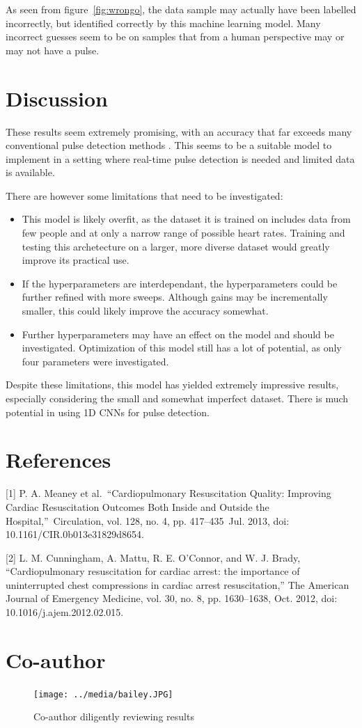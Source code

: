\documentclass{article}
\begin{document}
As seen from figure~\ref{fig:wrongo}, the data sample may actually have been labelled incorrectly, but identified correctly by this machine learning model. Many incorrect guesses seem to be on samples that from a human perspective may or may not have a pulse.


\section{Discussion}

These results seem extremely promising, with an accuracy that far exceeds many conventional pulse detection methods . This seems to be a suitable model to implement in a setting where real-time pulse detection is needed and limited data is available. 

There are however some limitations that need to be investigated:
\begin{itemize}

    \item This model is likely overfit, as the dataset it is trained on includes data from few people and at only a narrow range of possible heart rates. Training and testing this archetecture on a larger, more diverse dataset would greatly improve its practical use.
    \item If the hyperparameters are interdependant, the hyperparameters could be further refined with more sweeps. Although gains may be incrementally smaller, this could likely improve the accuracy somewhat. 
    \item Further hyperparameters may have an effect on the model and should be investigated. Optimization of this model still has a lot of potential, as only four parameters were investigated.
    
\end{itemize}

Despite these limitations, this model has yielded extremely impressive results, especially considering the small and somewhat imperfect dataset. There is much potential in using 1D CNNs for pulse detection.

\newpage
\section*{References}
{
\small

[1]	P. A. Meaney et al.\ “Cardiopulmonary Resuscitation Quality: Improving Cardiac Resuscitation Outcomes Both Inside and Outside the Hospital,”\ Circulation, vol. 128, no. 4, pp. 417–435\ Jul. 2013, doi: 10.1161/CIR.0b013e31829d8654.

[2]	L. M. Cunningham, A. Mattu, R. E. O’Connor, and W. J. Brady, “Cardiopulmonary resuscitation for cardiac arrest: the importance of uninterrupted chest compressions in cardiac arrest resuscitation,” The American Journal of Emergency Medicine, vol. 30, no. 8, pp. 1630–1638, Oct. 2012, doi: 10.1016/j.ajem.2012.02.015.
}

\newpage
\appendix

\section{Co-author}

\begin{figure}[H]
    \centering
    \texttt{[image: ../media/bailey.JPG]}
    \caption{Co-author diligently reviewing results}
    \label{fig:bailey}
\end{figure}
\end{document}
